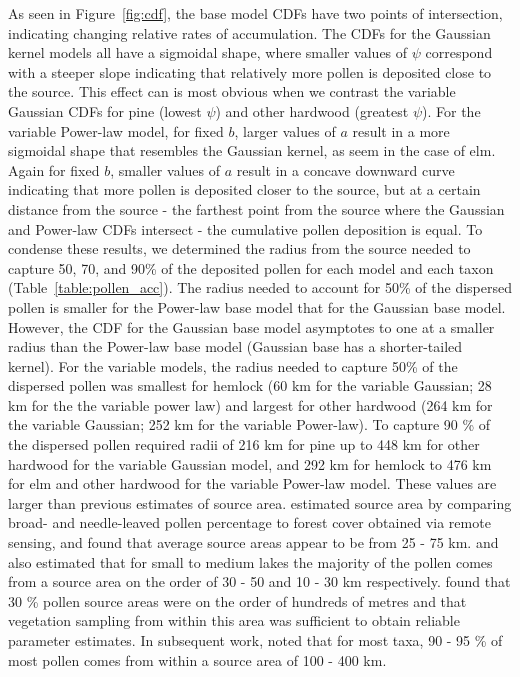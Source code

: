 \documentclass[12pt]{article}
\begin{document}
As seen in Figure~\ref{fig:cdf}, the base model CDFs have two points
of intersection, indicating changing relative rates of
accumulation. The CDFs for the Gaussian kernel models all have a
sigmoidal shape, where smaller values of $\psi$ correspond with a
steeper slope indicating that relatively more pollen is deposited
close to the source. This effect can is most obvious when we contrast
the variable Gaussian CDFs for pine (lowest $\psi$) and other hardwood
(greatest $\psi$). For the variable Power-law model, for fixed $b$,
larger values of $a$ result in a more sigmoidal shape that resembles
the Gaussian kernel, as seem in the case of elm. Again for fixed $b$,
smaller values of $a$ result in a concave downward curve indicating
that more pollen is deposited closer to the source, but at a certain
distance from the source - the farthest point from the source where
the Gaussian and Power-law CDFs intersect - the cumulative pollen
deposition is equal. To condense these results, we determined the
radius from the source needed to capture 50, 70, and 90\% of the
deposited pollen for each model and each taxon
(Table~\ref{table:pollen_acc}). The radius needed to account for 50\%
of the dispersed pollen is smaller for the Power-law base model that
for the Gaussian base model. However, the CDF for the Gaussian base
model asymptotes to one at a smaller radius than the Power-law base
model (Gaussian base has a shorter-tailed kernel). For the variable
models, the radius needed to capture 50\% of the dispersed pollen was
smallest for hemlock (60 km for the variable Gaussian; 28 km for the
the variable power law) and largest for other hardwood (264 km for the
variable Gaussian; 252 km for the variable Power-law). To capture 90
\% of the dispersed pollen required radii of 216 km for pine up to 448
km for other hardwood for the variable Gaussian model, and 292 km for
hemlock to 476 km for elm and other hardwood for the variable
Power-law model. These values are larger than previous estimates of
source area. \citet{} estimated source area by comparing broad- and
needle-leaved pollen percentage to forest cover obtained via remote
sensing, and found that average source areas appear to be from 25 - 75
km. \citet{prentice1987quantitative} and
\citet{bradshaw1985relationships} also estimated that for small to
medium lakes the majority of the pollen comes from a source area on
the order of 30 - 50 and 10 - 30 km
respectively. \citet{sugita1994pollen} found that 30 \% pollen source
areas were on the order of hundreds of metres and that vegetation
sampling from within this area was sufficient to obtain reliable
parameter estimates. In subsequent work, \citet{sugita2007theory2}
noted that for most taxa, 90 - 95 \% of most pollen comes from within
a source area of 100 - 400 km.
\end{document}
